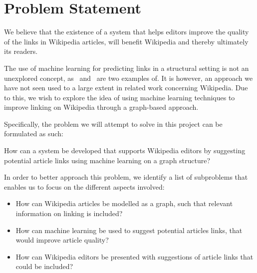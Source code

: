 \section{Problem Statement}\label{sec:problem_statement}
We believe that the existence of a system that helps editors improve the quality of the links in Wikipedia articles, will benefit Wikipedia and thereby ultimately its readers.

The use of machine learning for predicting links in a structural setting is not an unexplored concept, as~\cite{tang2015line} and~\cite{al2006link} are two examples of. It is however, an approach we have not seen used to a large extent in related work concerning Wikipedia. Due to this, we wish to explore the idea of using machine learning techniques to improve linking on Wikipedia through a graph-based approach.

Specifically, the problem we will attempt to solve in this project can be formulated as such:

\begin{formal}
How can a system be developed that supports Wikipedia editors by suggesting potential article links using machine learning on a graph structure?
\end{formal}

In order to better approach this problem, we identify a list of subproblems that enables us to focus on the different aspects involved:

\begin{itemize}
  \item How can Wikipedia articles be modelled as a graph, such that relevant information on linking is included?
  \item How can machine learning be used to suggest potential articles links, that would improve article quality?
  \item How can Wikipedia editors be presented with suggestions of article links that could be included?
\end{itemize}


